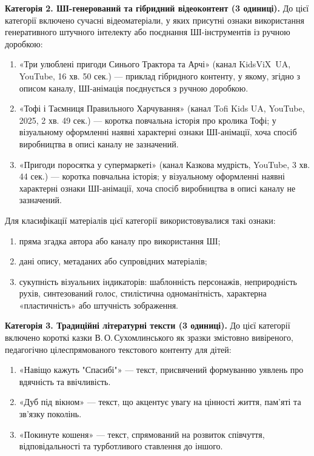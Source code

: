\documentclass[14pt, a4paper]{extreport}
\begin{document}
\textbf{Категорія 2. ШІ-генерований та гібридний відеоконтент (3 одиниці).}
До цієї категорії включено сучасні відеоматеріали, у яких присутні ознаки використання генеративного штучного інтелекту або поєднання ШІ-інструментів із ручною доробкою:
\begin{enumerate}
  \item «Три улюблені пригоди Синього Трактора та Арчі» (канал KidsViX~UA, YouTube, 16 хв. 50 сек.) --- приклад гібридного контенту, у якому, згідно з описом каналу, ШІ-анімація поєднується з ручною доробкою.
  \item «Тофі і Таємниця Правильного Харчування» (канал Tofi Kids UA, YouTube, 2025, 2 хв. 49 сек.) --- коротка повчальна історія про кролика Тофі; у візуальному оформленні наявні характерні ознаки ШІ-анімації, хоча спосіб виробництва в описі каналу не зазначений.
  \item «Пригоди поросятка у супермаркеті» (канал Казкова мудрість, YouTube, 3 хв. 44 сек.) --- коротка повчальна історія; у візуальному оформленні наявні характерні ознаки ШІ-анімації, хоча спосіб виробництва в описі каналу не зазначений.
\end{enumerate}
\newpage
Для класифікації матеріалів цієї категорії використовувалися такі ознаки:
\begin{enumerate}
  \item пряма згадка автора або каналу про використання ШІ;
  \item дані опису, метаданих або супровідних матеріалів;
  \item сукупність візуальних індикаторів: шаблонність персонажів, неприродність рухів, синтезований голос, стилістична одноманітність, характерна «пластичність» або штучність зображення.
\end{enumerate}

\textbf{Категорія 3. Традиційні літературні тексти (3 одиниці).}
До цієї категорії включено короткі казки В.\,О.\,Сухомлинського як зразки змістовно вивіреного, педагогічно цілеспрямованого текстового контенту для дітей:
\begin{enumerate}
  \item «Навіщо кажуть "Спасибі"» --- текст, присвячений формуванню уявлень про вдячність та ввічливість.
  \item «Дуб під вікном» --- текст, що акцентує увагу на цінності життя, пам'яті та зв'язку поколінь.
  \item «Покинуте кошеня» --- текст, спрямований на розвиток співчуття, відповідальності та турботливого ставлення до іншого.
\end{enumerate}
\end{document}

